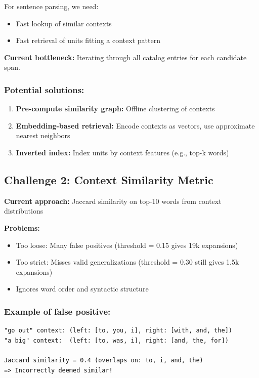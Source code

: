 \documentclass[11pt]{article}
\begin{document}
For sentence parsing, we need:
\begin{itemize}
\item Fast lookup of similar contexts
\item Fast retrieval of units fitting a context pattern
\end{itemize}

\textbf{Current bottleneck:} Iterating through all catalog entries for each candidate span.

\subsubsection{Potential solutions:}
\begin{enumerate}
\item \textbf{Pre-compute similarity graph:} Offline clustering of contexts
\item \textbf{Embedding-based retrieval:} Encode contexts as vectors, use approximate nearest neighbors
\item \textbf{Inverted index:} Index units by context features (e.g., top-k words)
\end{enumerate}

\subsection{Challenge 2: Context Similarity Metric}

\textbf{Current approach:} Jaccard similarity on top-10 words from context distributions

\textbf{Problems:}
\begin{itemize}
\item Too loose: Many false positives (threshold = 0.15 gives 19k expansions)
\item Too strict: Misses valid generalizations (threshold = 0.30 still gives 1.5k expansions)
\item Ignores word order and syntactic structure
\end{itemize}

\subsubsection{Example of false positive:}

\begin{lstlisting}[basicstyle=\small\ttfamily]
"go out" context: (left: [to, you, i], right: [with, and, the])
"a big" context:  (left: [to, was, i], right: [and, the, for])

Jaccard similarity = 0.4 (overlaps on: to, i, and, the)
=> Incorrectly deemed similar!
\end{lstlisting}
\end{document}
